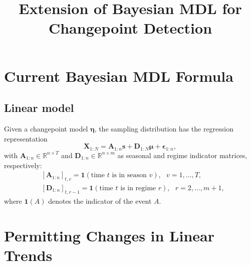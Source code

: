 \documentclass[12pt]{article}
\title{Extension of Bayesian MDL for Changepoint Detection} \date{}
\author{\blind{}{Yingbo Li\footnote{ e-mail: {\tt carolli13@gmail.com}.}}
       }
\begin{document}
\maketitle




%
%
%
%




\section{Current Bayesian MDL Formula}

\subsection{Linear model}

Given a changepoint model $\boldsymbol{\eta}$, the sampling distribution 
has the regression representation
\begin{equation}
\label{eq:likelihood3}
\mathbf{X}_{1:N} = \mathbf{A}_{1:n} \mathbf{s} + 
\mathbf{D}_{1:N}\boldsymbol\mu + \boldsymbol\epsilon_{1:n},
\end{equation}
with $\mathbf{A}_{1:n}\in \mathbb{R}^{n \times T}$ and 
$\mathbf{D}_{1:n} \in \mathbb{R}^{n \times m}$ as seasonal and regime 
indicator matrices, respectively:
\begin{align*}
&\left[ \mathbf{A}_{1:n} \right]_{t,v} = 
	\mathbf{1}( \text{time } t \text{ is in season } v ), ~~~ v = 1,  \ldots, T,\\
&\left[ \mathbf{D}_{1:n} \right]_{t,r-1} = 
	\mathbf{1}( \text{time } t \text{ is in regime } r ), ~~~ r = 2, \ldots, m + 1,
\end{align*}
where $\mathbf{1}(A)$ denotes the indicator of the event $A$. 

\section{Permitting Changes in Linear Trends}
\end{document}
